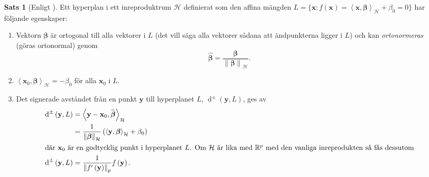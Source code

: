 \documentclass[a4paper, 12pt]{report}
\theoremstyle{definition}
\newtheorem{thm}{Sats}[section]
\theoremstyle{remark}
\newcommand{\bfbeta}{{\boldsymbol{\beta}}}
\newcommand{\bfx}{\mathbf{x}}
\newcommand{\llangle}{\left\langle}
\newcommand{\rrangle}{\right\rangle}
\newcommand{\sephyp}{\{ \mathbf{x} : f\left(\mathbf{x}\right)=\inner{\bfx}{\bfbeta}_\mathcal{H} + \beta_0=0\}}
\newcommand{\inner}[2]{\llangle #1, #2 \rrangle}
\newcommand{\hil}{\mathcal{H}}
\begin{document}
\begin{thm}[Enligt \cite{ESL}]\label{thm:hyperplan}
	Ett hyperplan i ett inreproduktrum $\hil$ definierat som den affina mängden $L=\sephyp$ har följande egenskaper:
	\begin{enumerate}
		\item Vektorn $\bfbeta$ är ortogonal till alla vektorer i $L$ (det vill säga alla vektorer sådana att ändpunkterna ligger i $L$) och kan \emph{ortonormeras} (göras ortonormal) genom
		\begin{equation*}
			\widehat{\bfbeta} = \frac{\bfbeta}{\left\|\bfbeta\right\|_\hil}.
		\end{equation*}
		\item $\inner{\bfx_0}{\bfbeta}_\hil = -\beta_0$ för alla $\mathbf{x}_0$ i $L$.
		\item
		Det signerade avståndet från en punkt $\mathbf{y}$ till hyperplanet $L$, $\operatorname{d}^\pm \left(\mathbf{y}, L\right)$, ges av
		\begin{align*}
			\operatorname{d}^\pm \left(\mathbf{y}, L\right) &=\inner{\mathbf{y}-\mathbf{x}_0}{\widehat{\bfbeta}}_\hil\\
			&=\frac{1}{\left\|\bfbeta\right\|_\hil}\left(\inner{\mathbf{y}}{\bfbeta}_\hil+\beta_0\right)\\
\intertext{där $\bfx_0$ är en godtycklig punkt i hyperplanet $L$. Om $\hil$ är lika med $\mathbb{R}^p$ med den vanliga inreprodukten så fås dessutom}
			\operatorname{d}^\pm \left(\mathbf{y}, L\right)			&=\frac{1}{\left\|f^\prime\left(\mathbf{y}\right)\right\|_p}f\left(\mathbf{y}\right).
		\end{align*}
	\end{enumerate}
\end{thm}
\end{document}
